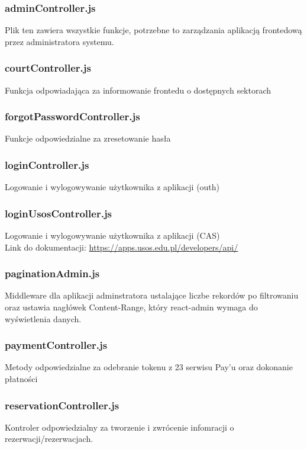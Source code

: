 \documentclass[titlepage]{article}
\begin{document}
\subsubsection{adminController.js}
Plik ten zawiera wszystkie funkcje, potrzebne to zarządzania aplikacją frontedową przez administratora systemu. 

\subsubsection{courtController.js}
Funkcja odpowiadająca za informowanie frontedu o dostępnych sektorach

\subsubsection{forgotPasswordController.js}
Funkcje odpowiedzialne za zresetowanie hasła

\subsubsection{loginController.js}
Logowanie i wylogowywanie użytkownika z aplikacji (outh)

\subsubsection{loginUsosController.js}
Logowanie i wylogowywanie użytkownika z aplikacji (CAS) \\
Link do dokumentacji: \url{https://apps.usos.edu.pl/developers/api/}

\subsubsection{paginationAdmin.js}
Middleware dla aplikacji adminstratora ustalające liczbe rekordów po filtrowaniu oraz ustawia nagłówek Content-Range, który react-admin wymaga do wyświetlenia danych.

\subsubsection{paymentController.js}
Metody odpowiedzialne za odebranie tokenu z 
23
 serwisu Pay'u oraz dokonanie płatności

\subsubsection{reservationController.js}
Kontroler odpowiedzialny za tworzenie i zwrócenie infomracji o rezerwacji/rezerwacjach.
\end{document}
